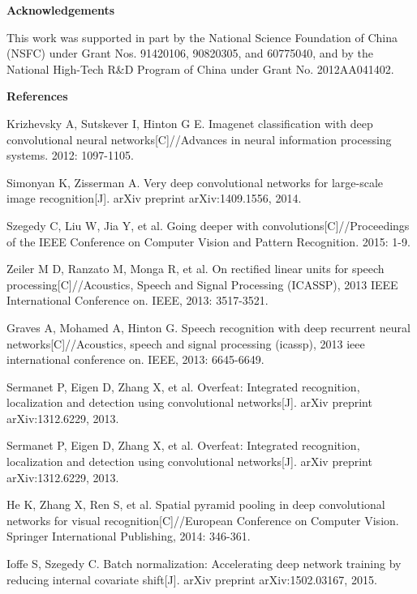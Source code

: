 \documentclass[10.5pt,compsoc]{TsT}
\theoremstyle{mystyle}
\begin{document}
{\vskip 2mm
\noindent
\textbf{Acknowledgements}
\vskip 2mm

\noindent
This work was supported in part by the National Science Foundation of China (NSFC) under Grant Nos. 91420106, 90820305, and 60775040, and by the National High-Tech R\&D Program of China under Grant No. 2012AA041402.

\vskip 2mm
\noindent
\textbf{References}
\vskip 2mm


\begin{thebibliography}{99}
 \addtolength{\itemsep}{-1em}
\vspace {1.5mm}

Krizhevsky A, Sutskever I, Hinton G E. Imagenet classification with deep convolutional neural networks[C]//Advances in neural information processing systems. 2012: 1097-1105.

Simonyan K, Zisserman A. Very deep convolutional networks for large-scale image recognition[J]. arXiv preprint arXiv:1409.1556, 2014.

Szegedy C, Liu W, Jia Y, et al. Going deeper with convolutions[C]//Proceedings of the IEEE Conference on Computer Vision and Pattern Recognition. 2015: 1-9.

Zeiler M D, Ranzato M, Monga R, et al. On rectified linear units for speech processing[C]//Acoustics, Speech and Signal Processing (ICASSP), 2013 IEEE International Conference on. IEEE, 2013: 3517-3521.

Graves A, Mohamed A, Hinton G. Speech recognition with deep recurrent neural networks[C]//Acoustics, speech and signal processing (icassp), 2013 ieee international conference on. IEEE, 2013: 6645-6649.

Sermanet P, Eigen D, Zhang X, et al. Overfeat: Integrated recognition, localization and detection using convolutional networks[J]. arXiv preprint arXiv:1312.6229, 2013.

Sermanet P, Eigen D, Zhang X, et al. Overfeat: Integrated recognition, localization and detection using convolutional networks[J]. arXiv preprint arXiv:1312.6229, 2013.

He K, Zhang X, Ren S, et al. Spatial pyramid pooling in deep convolutional networks for visual recognition[C]//European Conference on Computer Vision. Springer International Publishing, 2014: 346-361.

Ioffe S, Szegedy C. Batch normalization: Accelerating deep network training by reducing internal covariate shift[J]. arXiv preprint arXiv:1502.03167, 2015.


\end{thebibliography}}
\end{document}
